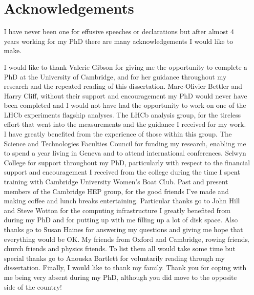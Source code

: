 




\chapter{Acknowledgements}

I have never been one for effusive speeches or declarations but after almost 4 years working for my PhD there are many acknowledgements I would like to make. %

I would like to thank Valerie Gibson for giving me the opportunity to complete a PhD at the University of Cambridge, and for her guidance throughout my research and the repeated reading of this dissertation. %
Marc-Olivier Bettler and Harry Cliff, without their support and encouragement my PhD would never have been completed and I would not have had the opportunity to work on one of the LHCb experiments flagship analyses.
The \bmumu LHCb analysis group, for the tireless effort that went into the \BF measurements and the guidance I received for my work. I have greatly benefited from the experience of those within this group. 
The Science and Technologies Faculties Council for funding my research, enabling me to spend a year living in Geneva and to attend international conferences. Selwyn College for support throughout my PhD, particularly with respect to the financial support and encouragement I received from the college during the time I spent training with Cambridge University Women's Boat Club. %
Past and present members of the Cambridge HEP group, for the good friends I've made and making coffee and lunch breaks entertaining. Particular thanks go to John Hill and Steve Wotton for the computing infrastructure I greatly benefited from during my PhD and for putting up with me filling up a lot of disk space. Also thanks go to Susan Haines for answering my questions and giving me hope that everything would be OK. 
My friends from Oxford and Cambridge, rowing friends, church friends and physics friends. To list them all would take some time but special thanks go to Anouska Bartlett for voluntarily reading through my dissertation. %
Finally, I would like to thank my family. Thank you for coping with me being very absent during my PhD, although you did move to the opposite side of the country! 

